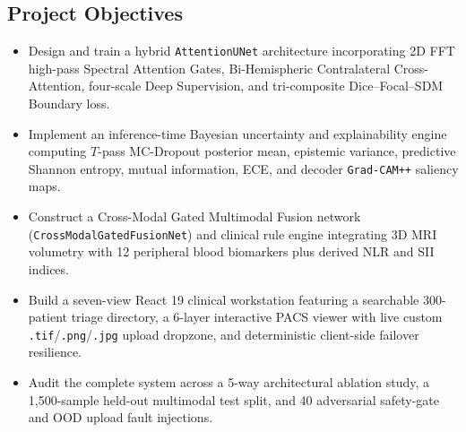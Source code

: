 \documentclass[journal,onecolumn,10pt]{IEEEtran}
\begin{document}
\subsection{Project Objectives}
\begin{itemize}
    \item Design and train a hybrid \texttt{AttentionUNet} architecture incorporating 2D FFT high-pass Spectral Attention Gates, Bi-Hemispheric Contralateral Cross-Attention, four-scale Deep Supervision, and tri-composite Dice--Focal--SDM Boundary loss.
    \item Implement an inference-time Bayesian uncertainty and explainability engine computing $T$-pass MC-Dropout posterior mean, epistemic variance, predictive Shannon entropy, mutual information, ECE, and decoder \texttt{Grad-CAM++} saliency maps.
    \item Construct a Cross-Modal Gated Multimodal Fusion network (\texttt{CrossModalGatedFusionNet}) and clinical rule engine integrating 3D MRI volumetry with 12 peripheral blood biomarkers plus derived NLR and SII indices.
    \item Build a seven-view React 19 clinical workstation featuring a searchable 300-patient triage directory, a 6-layer interactive PACS viewer with live custom \texttt{.tif}/\texttt{.png}/\texttt{.jpg} upload dropzone, and deterministic client-side failover resilience.
    \item Audit the complete system across a 5-way architectural ablation study, a 1,500-sample held-out multimodal test split, and 40 adversarial safety-gate and OOD upload fault injections.
\end{itemize}
\end{document}
